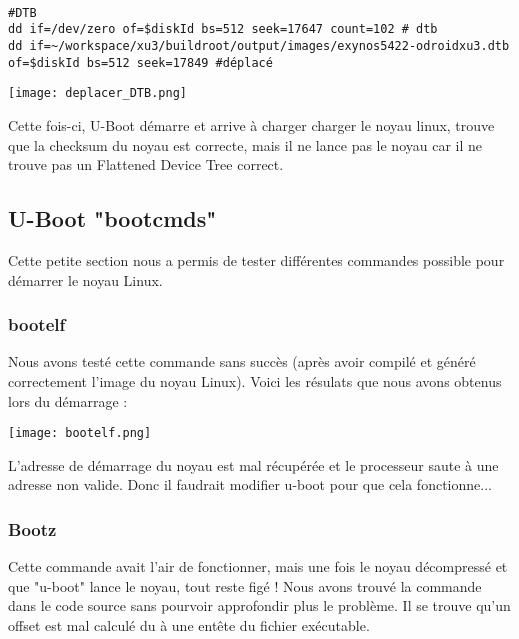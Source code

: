 \begin{lstlisting}[frame=single,style=Console]  % Start your code-block

#DTB
dd if=/dev/zero of=$diskId bs=512 seek=17647 count=102 # dtb
dd if=~/workspace/xu3/buildroot/output/images/exynos5422-odroidxu3.dtb of=$diskId bs=512 seek=17849 #déplacé 
\end{lstlisting}

\begin{center} 
\hspace{15cm}
\texttt{[image: deplacer\_DTB.png]}
\end{center}
\vspace{0.5cm}

Cette fois-ci, U-Boot démarre et arrive à charger charger le noyau linux, trouve que la checksum du noyau est correcte, mais il ne lance pas le noyau car il ne trouve pas un Flattened Device Tree correct.

\pagebreak
\subsection{U-Boot "bootcmds"}
Cette petite section nous a permis de tester différentes commandes possible pour démarrer le noyau Linux.

\subsubsection{bootelf}
Nous avons testé cette commande sans succès (après avoir compilé et généré correctement l'image du noyau Linux). Voici les résulats que nous avons obtenus lors du démarrage :
\begin{center} 
\hspace{15cm}
\texttt{[image: bootelf.png]}
\end{center}
\vspace{0.5cm}

L'adresse de démarrage du noyau est mal récupérée et le processeur saute à une adresse non valide. Donc il faudrait modifier u-boot pour que cela fonctionne... 

\subsubsection{Bootz}

Cette commande avait l'air de fonctionner, mais une fois le noyau décompressé et que "u-boot" lance le noyau, tout reste figé ! Nous avons trouvé la commande dans le code source sans pourvoir approfondir plus le problème. Il se trouve qu'un offset est mal calculé du à une entête du fichier exécutable.

